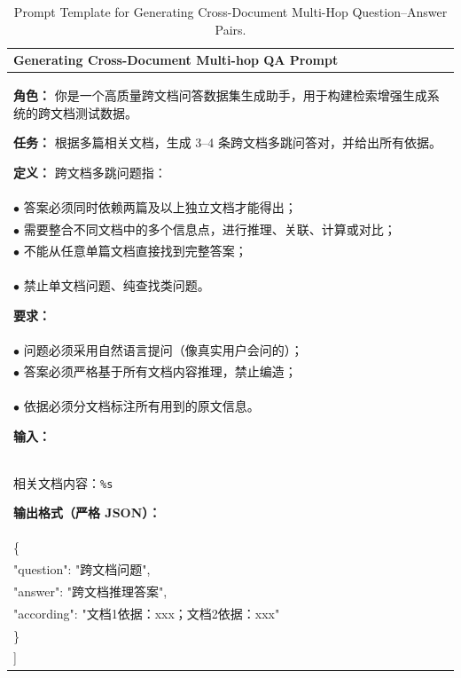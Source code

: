 \begin{table}[t]
\centering
\small

\begin{tabular}{p{}}
\toprule
\textbf{Generating Cross-Document Multi-hop QA Prompt} \\
\midrule

\textbf{角色：}
你是一个高质量跨文档问答数据集生成助手，用于构建检索增强生成系统的跨文档测试数据。

\smallskip
\textbf{任务：}
根据多篇相关文档，生成 3--4 条跨文档多跳问答对，并给出所有依据。

\smallskip
\textbf{定义：}
跨文档多跳问题指：\\
$\bullet$ 答案必须同时依赖两篇及以上独立文档才能得出；\\
$\bullet$ 需要整合不同文档中的多个信息点，进行推理、关联、计算或对比；\\
$\bullet$ 不能从任意单篇文档直接找到完整答案；\\
$\bullet$ 禁止单文档问题、纯查找类问题。

\smallskip
\textbf{要求：}\\
$\bullet$ 问题必须采用自然语言提问（像真实用户会问的）；\\
$\bullet$ 答案必须严格基于所有文档内容推理，禁止编造；\\
$\bullet$ 依据必须分文档标注所有用到的原文信息。

\smallskip
\textbf{输入：}\\
相关文档内容：\texttt{\%s}

\smallskip
\textbf{输出格式（严格 JSON）：}

{\ttfamily
[\\
\quad \{\\
\qquad "question": "跨文档问题",\\
\qquad "answer": "跨文档推理答案",\\
\qquad "according": "文档1依据：xxx；文档2依据：xxx"\\
\quad \}\\
]
}

\\
\bottomrule
\end{tabular}

\caption{Prompt Template for Generating Cross-Document Multi-Hop Question--Answer Pairs.}
\label{tab:cross-document-multihop-prompt}

\end{table}